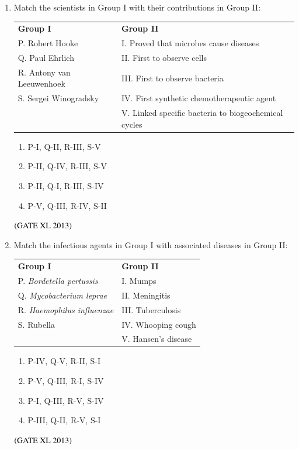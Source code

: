\documentclass[journal]{IEEEtran}
\begin{document}
\begin{enumerate}
\begin{enumerate}
\item Match the scientists in Group I with their contributions in Group II:  
\begin{tabular}{ll}
\textbf{Group I} & \textbf{Group II} \\
P. Robert Hooke & I. Proved that microbes cause diseases \\
Q. Paul Ehrlich & II. First to observe cells \\
R. Antony van Leeuwenhoek & III. First to observe bacteria \\
S. Sergei Winogradsky & IV. First synthetic chemotherapeutic agent \\
& V. Linked specific bacteria to biogeochemical cycles \\
\end{tabular}
\begin{enumerate}
\item P-I, Q-II, R-III, S-V
\item P-II, Q-IV, R-III, S-V
\item P-II, Q-I, R-III, S-IV
\item P-V, Q-III, R-IV, S-II
\end{enumerate}
\hfill $\left(\text{GATE XL 2013}\right)$

\item Match the infectious agents in Group I with associated diseases in Group II:  
\begin{tabular}{ll}
\textbf{Group I} & \textbf{Group II} \\
P. \textit{Bordetella pertussis} & I. Mumps \\
Q. \textit{Mycobacterium leprae} & II. Meningitis \\
R. \textit{Haemophilus influenzae} & III. Tuberculosis \\
S. Rubella & IV. Whooping cough \\
& V. Hansen's disease \\
\end{tabular}
\begin{enumerate}
\item P-IV, Q-V, R-II, S-I
\item P-V, Q-III, R-I, S-IV
\item P-I, Q-III, R-V, S-IV
\item P-III, Q-II, R-V, S-I
\end{enumerate}
\hfill $\left(\text{GATE XL 2013}\right)$


\end{enumerate}
\end{enumerate}
\end{document}
